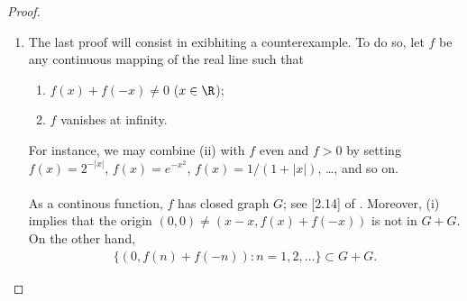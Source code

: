 \begin{proof}
\begin{enumerate}
%
To do so, let the variable $\mathit{a}$ range over $A$: %
Every set $a+B$ is closed as well: see [1.7] of \cite{FA}. %
%
Trivially, $a+B \neq c$: By [1.10] of \cite{FA}, %
there so exists $V=V(a)$ a neighborhood of the origin such that %
%
\begin{align}\label{separation}
  (a+B + V) \cap (c+V) = \emptyset.
\end{align}
%
Moreover, there are finitely many $a+V$, say $a_1 + V_1, a_2 + V_2, \dots$, %
whose union $U$ contains the compact set $A$. Therefore, %
%
\begin{align}\label{U + B encloses A + B}
  A+B \subset U + B.
\end{align}
%
Now define %
\begin{align}
  W \triangleq V_1 \cap V_2 \cap \cdots, 
\end{align}
%
so that 
%
\begin{align}
  (a_i + B + V_i) \cap (c + W) \overset{(\ref{separation})}{=} \emptyset %
  \quad (i = 1, 2, \dots).
\end{align}
%
As a conclusion, $c$ is not in the closure of $U+B$. %
Finally, we use (\ref{U + B encloses A + B}) to assert that $c$ %
is not in $\overline{A+B}$ either; which achieves the proof. \\
\\
\textbf{Corollary}: If $B$ is the closure of a set $S$, then %
%
\begin{align}
  A+B \subset \overline{A+S} \subset \overline{A+B} = A + B
\end{align}
%
by (b) of [1.13] of \cite{FA} (since $A$ is closed; %
see [1.12] from the same source). %
This special case will occur in the proof of exercise 15 of chapter 2. %
%
\item The last proof will consist in exibhiting a counterexample. %
To do so, let $f$ be any continuous mapping of the real line such that %
\renewcommand{\labelenumii}{(\roman{enumii})} 
\begin{enumerate}
  \item $f(x) + f(\minus x) \neq 0$ \quad ($x \in \R$);
  \item $f$ vanishes at infinity. 
\end{enumerate}
For instance, we may combine (ii) with $f$ even and $f>0$ by setting %
%
  $f(x) = 2^{\minus |x|}$, %
  $f(x) = e^{\minus x^2}$, %
  $f(x) = 1/(1+|x|)$, \dots, %
%
and so on. \\
\\
As a continous function, $f$ has closed graph $G$; see [2.14] of \cite{FA}. %
%
Moreover, (i) implies that the origin %
%
  $(0, 0) \neq \left(x-x, f(x)+ f(\minus x)\right)$ %
% 
is not in $G+G$. %
%
On the other hand, 
%
\begin{align}
  \{ \left(0, f(n) + f(\minus n)\right): n=1, 2, \dots\} \subset G + G.
\end{align}
%


\end{enumerate}
\end{proof}
